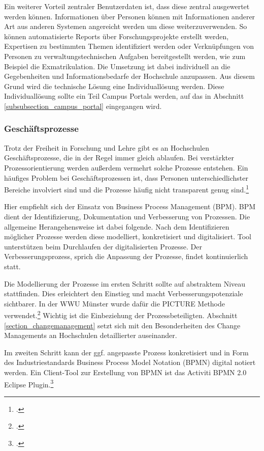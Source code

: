 Ein weiterer Vorteil zentraler Benutzerdaten ist, dass diese zentral ausgewertet werden können. Informationen über Personen können mit Informationen anderer Art aus anderen Systemen angereicht werden um diese weiterzuverwenden. So können automatisierte Reports über Forschungsprojekte erstellt werden, Expertisen zu bestimmten Themen identifiziert werden oder Verknüpfungen von Personen zu verwaltungstechnischen Aufgaben bereitgestellt werden, wie zum Beispiel die Exmatrikulation. Die Umsetzung ist dabei individuell an die Gegebenheiten und Informationsbedarfe der Hochschule anzupassen. Aus diesem Grund wird die technische Lösung eine Individuallösung werden. Diese Individuallösung sollte ein Teil Campus Portals werden, auf das in Abschnitt \ref{subsubsection_campus_portal} eingegangen wird. 

\subsubsection{Geschäftsprozesse}
Trotz der Freiheit in Forschung und Lehre gibt es an Hochschulen Geschäftsprozesse, die in der Regel immer gleich ablaufen. Bei verstärkter Prozessorientierung werden außerdem vermehrt solche Prozesse entstehen. Ein häufiges Problem bei Geschäftsprozessen ist, dass Personen unterschiedlichster Bereiche involviert sind und die Prozesse häufig nicht transparent genug sind.\footcite[Vgl.][12]{becker_prozesse_2010}

Hier empfiehlt sich der Einsatz von Business Process Management (BPM). BPM dient der Identifizierung, Dokumentation und Verbesserung von Prozessen. Die allgemeine Herangehensweise ist dabei folgende. Nach dem Identifizieren möglicher Prozesse werden diese modelliert, konkretisiert und digitalisiert. Tool unterstützen beim Durchlaufen der digitalisierten Prozesse. Der Verbesserungsprozess, sprich die Anpassung der Prozesse, findet kontinuierlich statt.

Die Modellierung der Prozesse im ersten Schritt sollte auf abstraktem Niveau stattfinden. Dies erleichtert den Einstieg und macht Verbesserungspotenziale sichtbarer. In der WWU Münster wurde dafür die PICTURE Methode verwendet.\footcite[Vgl.][16]{becker_prozesse_2010} Wichtig ist die Einbeziehung der Prozessbeteiligten. Abschnitt \ref{section_changemanagement} setzt sich mit den Besonderheiten des Change Managements an Hochschulen detaillierter auseinander.

Im zweiten Schritt kann der ggf. angepasste Prozess konkretisiert und in Form des Industriestandards Business Process Model Notation (BPMN) digital notiert werden. Ein Client-Tool zur Erstellung von BPMN ist das Activiti BPMN 2.0 Eclipse Plugin.\footcite{eclipse_bpmn2_modeler}

